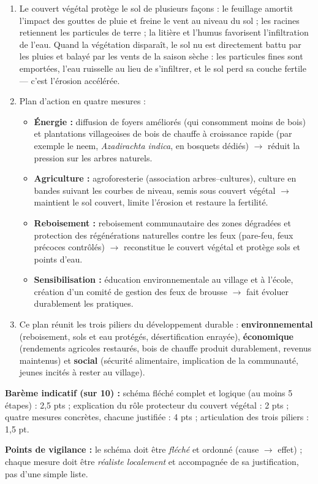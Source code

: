 \documentclass[11pt]{article}
\begin{document}
\begin{corrige}
\begin{enumerate}
\item Le couvert végétal protège le sol de plusieurs façons : le feuillage amortit l'impact des gouttes de pluie et freine le vent au niveau du sol ; les racines retiennent les particules de terre ; la litière et l'humus favorisent l'infiltration de l'eau. Quand la végétation disparaît, le sol nu est directement battu par les pluies et balayé par les vents de la saison sèche : les particules fines sont emportées, l'eau ruisselle au lieu de s'infiltrer, et le sol perd sa couche fertile — c'est l'érosion accélérée.
\item Plan d'action en quatre mesures :
\begin{itemize}
\item \textbf{Énergie :} diffusion de foyers améliorés (qui consomment moins de bois) et plantations villageoises de bois de chauffe à croissance rapide (par exemple le neem, \emph{Azadirachta indica}, en bosquets dédiés) $\rightarrow$ réduit la pression sur les arbres naturels.
\item \textbf{Agriculture :} agroforesterie (association arbres--cultures), culture en bandes suivant les courbes de niveau, semis sous couvert végétal $\rightarrow$ maintient le sol couvert, limite l'érosion et restaure la fertilité.
\item \textbf{Reboisement :} reboisement communautaire des zones dégradées et protection des régénérations naturelles contre les feux (pare-feu, feux précoces contrôlés) $\rightarrow$ reconstitue le couvert végétal et protège sols et points d'eau.
\item \textbf{Sensibilisation :} éducation environnementale au village et à l'école, création d'un comité de gestion des feux de brousse $\rightarrow$ fait évoluer durablement les pratiques.
\end{itemize}
\item Ce plan réunit les trois piliers du développement durable : \textbf{environnemental} (reboisement, sols et eau protégés, désertification enrayée), \textbf{économique} (rendements agricoles restaurés, bois de chauffe produit durablement, revenus maintenus) et \textbf{social} (sécurité alimentaire, implication de la communauté, jeunes incités à rester au village).
\end{enumerate}
\textbf{Barème indicatif (sur 10) :} schéma fléché complet et logique (au moins 5 étapes) : 2,5 pts ; explication du rôle protecteur du couvert végétal : 2 pts ; quatre mesures concrètes, chacune justifiée : 4 pts ; articulation des trois piliers : 1,5 pt.

\textbf{Points de vigilance :} le schéma doit être \emph{fléché} et ordonné (cause $\rightarrow$ effet) ; chaque mesure doit être \emph{réaliste localement} et accompagnée de sa justification, pas d'une simple liste.
\end{corrige}
\end{document}
